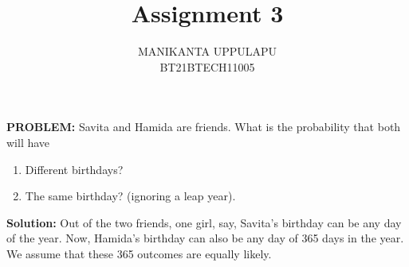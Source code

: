 \documentclass[journal,12pt,twocolumn]{IEEEtran}
\title{Assignment 3}
\author{MANIKANTA UPPULAPU\\BT21BTECH11005}
\date{}
\newcommand{\PROBLEM}{\noindent \textbf{PROBLEM: }}
\newcommand{\solution}{\noindent \textbf{Solution: }}
\begin{document}
\maketitle
\PROBLEM Savita and Hamida are friends. What is the probability that both will have 
\begin{enumerate}[label=(\roman{enumi})]
	\item Different birthdays?
	\item The same birthday? (ignoring a leap year).
\end{enumerate}

\solution Out of the two friends, one girl, say, Savita's birthday can be any day of the year. Now, Hamida's birthday can also be any day of 365 days in the year.\\
We assume that these 365 outcomes are equally likely.\\
\end{document}
